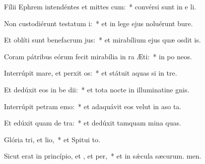 \item Fílii Ephrem intendéntes et mittes cum:~* convérsi sunt in e li.
\item Non custodiérunt testatum i:~* et in lege ejus noluérunt bure.
\item Et oblíti sunt benefacrum jus:~* et mirabílium ejus quæ osdit is.
\item Coram pátribus eórum fecit mirabília in ra Æti:~* in po neos.
\item Interrúpit mare, et perxit os:~* et státuit aquas si in tre.
\item Et dedúxit eos in be dii:~* et tota nocte in illuminatine gnis.
\item Interrúpit petram  emo:~* et adaquávit eos velut in aso ta.
\item Et edúxit quam de tra:~* et dedúxit tamquam mina quas.
\item Glória tri, et lio,~* et Spitui to.
\item Sicut erat in princípio, et , et per,~* et in sǽcula sæcurum. men.
